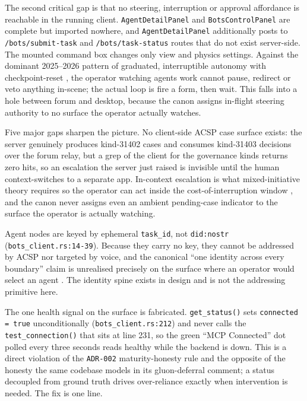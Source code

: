 The second critical gap is that no steering, interruption or approval affordance is reachable in the running client. \texttt{AgentDetailPanel} and \texttt{BotsControlPanel} are complete but imported nowhere, and \texttt{AgentDetailPanel} additionally posts to \texttt{/bots/submit-task} and \texttt{/bots/task-status} routes that do not exist server-side. The mounted command box changes only view and physics settings. Against the dominant 2025--2026 pattern of graduated, interruptible autonomy with checkpoint-reset \parencite{Epperson2025Debugging}, the operator watching agents work cannot pause, redirect or veto anything in-scene; the actual loop is fire a form, then wait. This falls into a hole between forum and desktop, because the canon assigns in-flight steering authority to no surface the operator actually watches.

Five major gaps sharpen the picture. No client-side ACSP case surface exists: the server genuinely produces kind-31402 cases and consumes kind-31403 decisions over the forum relay, but a grep of the client for the governance kinds returns zero hits, so an escalation the server just raised is invisible until the human context-switches to a separate app. In-context escalation is what mixed-initiative theory requires so the operator can act inside the cost-of-interruption window \parencite{Horvitz1999Principles}, and the canon never assigns even an ambient pending-case indicator to the surface the operator is actually watching.

Agent nodes are keyed by ephemeral \texttt{task\_id}, not \texttt{did:nostr} (\texttt{bots\_client.rs:14-39}). Because they carry no key, they cannot be addressed by ACSP nor targeted by voice, and the canonical ``one identity across every boundary'' claim is unrealised precisely on the surface where an operator would select an agent \parencite{AuthenticatedDelegation2025}. The identity spine exists in design and is not the addressing primitive here.

The one health signal on the surface is fabricated. \texttt{get\_status()} sets \texttt{connected = true} unconditionally (\texttt{bots\_client.rs:212}) and never calls the \texttt{test\_connection()} that sits at line 231, so the green ``MCP Connected'' dot polled every three seconds reads healthy while the backend is down. This is a direct violation of the \texttt{ADR-002} maturity-honesty rule and the opposite of the honesty the same codebase models in its gluon-deferral comment; a status decoupled from ground truth drives over-reliance exactly when intervention is needed. The fix is one line.

